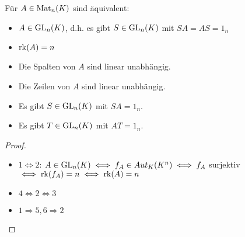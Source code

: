 \begin{conclusion}
	Für $A\in \operatorname{Mat}_n(K)$ sind äquivalent:
	\begin{itemize}
		\item $A\in \operatorname{GL}_n(K)$, d.h. es gibt $S\in \operatorname{GL}_n(K)$ mit $SA=AS=1_n$
		\item $\operatorname{rk}(A)=n$
		\item Die Spalten von $A$ sind linear unabhängig.
		\item Die Zeilen von $A$ sind linear unabhängig.
		\item Es gibt $S\in \operatorname{GL}_n(K)$ mit $SA=1_n$.
		\item Es gibt $T\in \operatorname{GL}_n(K)$ mit $AT=1_n$.
	\end{itemize}
\end{conclusion}
\begin{proof}
	\begin{itemize}
		\item $1\iff 2$: $A\in \operatorname{GL}_n(K)\iff f_A\in Aut_K(K^n)\iff f_A$ surjektiv $\iff \operatorname{rk}(f_A)=n\iff \operatorname{rk}(A)=n$
		\item $4\iff 2 \iff 3$
		\item $1\Rightarrow 5,6 \Rightarrow 2$
	\end{itemize}
\end{proof}